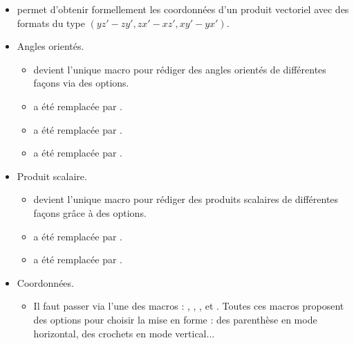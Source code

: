 \documentclass[12pt,a4paper]{book}
\begin{document}
\begin{description}
\begin{itemize}[itemsep=.5em]
\begin{itemize}[itemsep=.5em]
        \item {} permet d'obtenir formellement les coordonnées d'un produit vectoriel avec des formats du type $(y z' - z y' , z x' - x z ' , x y' - y x')$.


        \item Angles orientés.
        
        \begin{itemize}[itemsep=.5em, label=$\rightarrow$]
            \item {} devient l'unique macro pour rédiger des angles orientés de différentes façons via des options.
            
            \item {}  a été remplacée par .
            
            \item {}  a été remplacée par .
                  
            \item {} a été remplacée par .
	    \end{itemize}


        \item Produit scalaire.
        
        \begin{itemize}[itemsep=.5em, label=$\rightarrow$]
            \item {} devient l'unique macro pour rédiger des produits scalaires de différentes façons grâce à des options.
            
            \item {}  a été remplacée par .

            \item {} a été remplacée par .
	    \end{itemize}


        \item Coordonnées.
        
        \begin{itemize}[itemsep=.5em, label=$\rightarrow$]
            \item Il faut passer via l'une des macros : , , ,  et .
                  Toutes ces macros proposent des options pour choisir la mise en forme : des parenthèse en mode horizontal, des crochets en mode vertical...


\end{itemize}
\end{itemize}
\end{itemize}
\end{description}
\end{document}

